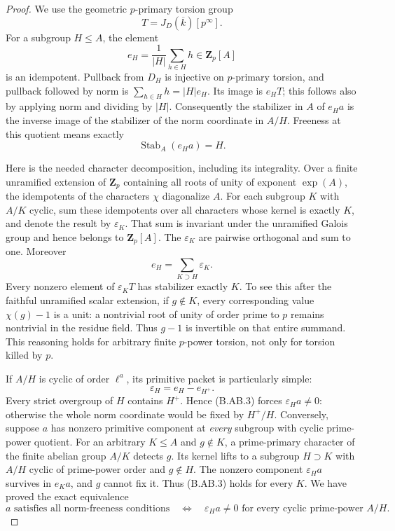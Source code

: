\begin{proof}
We use the geometric $p$-primary torsion group
\[
                   T=J_D(\overline k)[p^\infty].
\]
For a subgroup $H\le A$, the element
\[
                   e_H=\frac1{|H|}\sum_{h\in H}h
                         \in\mathbf Z_p[A]
\]
is an idempotent. Pullback from $D_H$ is injective on
$p$-primary torsion, and pullback followed by norm is
$\sum_{h\in H}h=|H|e_H$. Its image is $e_HT$; this follows
also by applying norm and dividing by $|H|$. Consequently
the stabilizer in $A$ of $e_Ha$ is the inverse image of the
stabilizer of the norm coordinate in $A/H$. Freeness at this
quotient means exactly
\[
                         \operatorname{Stab}_A(e_Ha)=H.         \tag{B.AB.3}
\]

Here is the needed character decomposition, including its
integrality. Over a finite unramified extension of $\mathbf Z_p$
containing all roots of unity of exponent $\exp(A)$, the
idempotents of the characters $\chi$ diagonalize $A$.
For each subgroup $K$ with $A/K$ cyclic, sum these idempotents
over all characters whose kernel is exactly $K$, and denote
the result by $\varepsilon_K$. That sum is invariant under
the unramified Galois group and hence belongs to
$\mathbf Z_p[A]$. The $\varepsilon_K$ are pairwise orthogonal
and sum to one. Moreover
\[
       e_H=\sum_{K\supset H}\varepsilon_K.                     \tag{B.AB.4}
\]
Every nonzero element of $\varepsilon_KT$ has stabilizer
exactly $K$. To see this after the faithful unramified scalar
extension, if $g\notin K$, every corresponding value
$\chi(g)-1$ is a unit: a nontrivial root of unity of order
prime to $p$ remains nontrivial in the residue field. Thus
$g-1$ is invertible on that entire summand. This reasoning
holds for arbitrary finite $p$-power torsion, not only for
torsion killed by $p$.

If $A/H$ is cyclic of order $\ell^a$, its primitive packet is
particularly simple:
\[
                         \varepsilon_H=e_H-e_{H^+}.            \tag{B.AB.5}
\]
Every strict overgroup of $H$ contains $H^+$. Hence (B.AB.3)
forces $\varepsilon_Ha\ne0$: otherwise the whole norm
coordinate would be fixed by $H^+/H$. Conversely, suppose
$a$ has nonzero primitive component at \emph{every} subgroup
with cyclic prime-power quotient. For an arbitrary $K\le A$
and $g\notin K$, a prime-primary character of the finite
abelian group $A/K$ detects $g$. Its kernel lifts to a subgroup
$H\supset K$ with $A/H$ cyclic of prime-power order and
$g\notin H$. The nonzero component $\varepsilon_Ha$ survives
in $e_Ka$, and $g$ cannot fix it. Thus (B.AB.3) holds for
every $K$. We have proved the exact equivalence
\[
 a\text{ satisfies all norm-freeness conditions}
 \quad\Longleftrightarrow\quad
 \varepsilon_Ha\ne0\text{ for every cyclic prime-power }A/H.
                                                                  \tag{B.AB.6}
\]


\end{proof}

